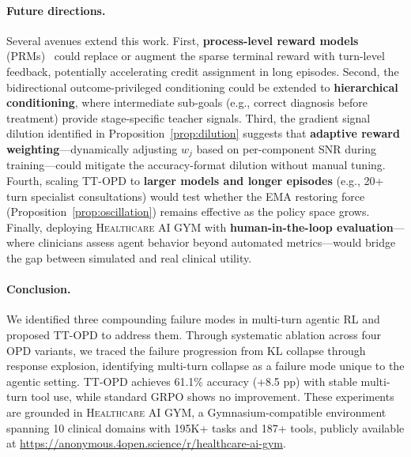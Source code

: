 \documentclass{article}
\newcommand{\gym}{\textsc{Healthcare AI GYM}}
\begin{document}
\paragraph{Future directions.} Several avenues extend this work. First, \textbf{process-level reward models} (PRMs)~\citep{lightman2024lets, uesato2022solving} could replace or augment the sparse terminal reward with turn-level feedback, potentially accelerating credit assignment in long episodes. Second, the bidirectional outcome-privileged conditioning could be extended to \textbf{hierarchical conditioning}, where intermediate sub-goals (e.g., correct diagnosis before treatment) provide stage-specific teacher signals. Third, the gradient signal dilution identified in Proposition~\ref{prop:dilution} suggests that \textbf{adaptive reward weighting}---dynamically adjusting $w_j$ based on per-component SNR during training---could mitigate the accuracy-format dilution without manual tuning. Fourth, scaling TT-OPD to \textbf{larger models and longer episodes} (e.g., 20+ turn specialist consultations) would test whether the EMA restoring force (Proposition~\ref{prop:oscillation}) remains effective as the policy space grows. Finally, deploying \gym{} with \textbf{human-in-the-loop evaluation}---where clinicians assess agent behavior beyond automated metrics---would bridge the gap between simulated and real clinical utility.

\paragraph{Conclusion.}
We identified three compounding failure modes in multi-turn agentic RL and proposed TT-OPD to address them. Through systematic ablation across four OPD variants, we traced the failure progression from KL collapse through response explosion, identifying multi-turn collapse as a failure mode unique to the agentic setting. TT-OPD achieves 61.1\% accuracy (+8.5 pp) with stable multi-turn tool use, while standard GRPO shows no improvement. These experiments are grounded in \gym{}, a Gymnasium-compatible environment spanning 10 clinical domains with 195K+ tasks and 187+ tools, publicly available at \url{https://anonymous.4open.science/r/healthcare-ai-gym}.


\end{document}
